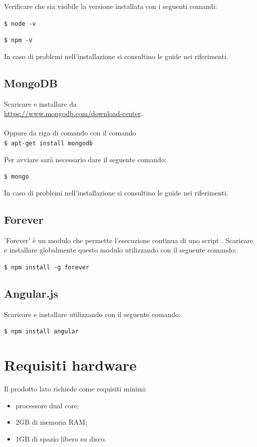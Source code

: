 \documentclass[a4paper, titlepage]{article}
\begin{document}
	Verificare che sia visibile la versione installata con i seguenti comandi:
	
	\texttt{\$ node -v}
	
	\texttt{\$ npm -v}
	
	In caso di problemi nell'installazione si consultino le guide nei riferimenti.

	\subsection{MongoDB}
	Scaricare e installare  da\\ \url{https://www.mongodb.com/download-center}.\\
	\\Oppure da riga di comando con il comando\\
	\texttt{\$ apt-get install mongodb}
	
	Per avviare  sarà necessario dare il seguente comando:
	
	\texttt{\$ mongo}
	
	In caso di problemi nell'installazione si consultino le guide nei riferimenti.

	\subsection{Forever}
	'Forever' è un modulo  che permette l'esecuzione continua di uno script .
	Scaricare e installare globalmente questo modulo utilizzando  con il seguente comando:

	\texttt{\$ npm install -g forever}
	
	\subsection{Angular.js}
	Scaricare e installare  utilizzando  con il seguente comando:

	\texttt{\$ npm install angular}
	
	\section{Requisiti hardware}
	Il prodotto lato  richiede come requisiti minimi:
	\begin{itemize}
		\item processore dual core;
		\item 2GB di memoria RAM;
		\item 1GB di spazio libero su disco.
	\end{itemize}
	
\end{document}
